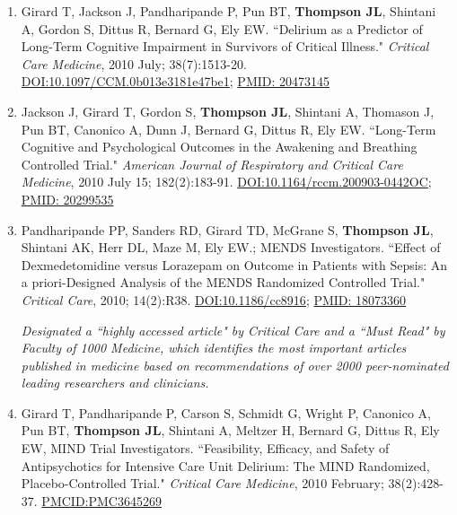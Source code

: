 \documentclass[5pt]{article}
\begin{document}
\begin{enumerate}
\item Girard T, Jackson J, Pandharipande P, Pun BT, \textbf{Thompson JL}, Shintani A, Gordon S, Dittus R, Bernard G, Ely EW. ``Delirium as a Predictor of Long-Term Cognitive Impairment in Survivors of Critical Illness." \emph{Critical Care Medicine}, 2010 July; 38(7):1513-20. \href{https://doi.org/10.1097/CCM.0b013e3181e47be1}{DOI:10.1097/CCM.0b013e3181e47be1}; \href{https://www.ncbi.nlm.nih.gov/pubmed/20473145}{PMID: 20473145}
\item Jackson J, Girard T, Gordon S, \textbf{Thompson JL}, Shintani A, Thomason J, Pun BT, Canonico A, Dunn J, Bernard G, Dittus R, Ely EW. ``Long-Term Cognitive and Psychological Outcomes in the Awakening and Breathing Controlled Trial." \emph{American Journal of Respiratory and Critical Care Medicine}, 2010 July 15; 182(2):183-91. \href{https://doi.org/10.1164/rccm.200903-0442OC}{DOI:10.1164/rccm.200903-0442OC}; \href{https://www.ncbi.nlm.nih.gov/pubmed/20299535}{PMID: 20299535}
\item Pandharipande PP, Sanders RD, Girard TD, McGrane S, \textbf{Thompson JL}, Shintani AK, Herr DL, Maze M, Ely EW.; MENDS Investigators. ``Effect of Dexmedetomidine versus Lorazepam on Outcome in Patients with Sepsis: An a priori-Designed Analysis of the MENDS Randomized Controlled Trial." \emph{Critical Care}, 2010; 14(2):R38. \href{https://doi.org/10.1186/cc8916}{DOI:10.1186/cc8916}; \href{https://www.ncbi.nlm.nih.gov/pubmed/18073360}{PMID: 18073360}

    \emph{Designated a ``highly accessed article" by Critical Care and a ``Must Read" by Faculty of 1000 Medicine, which identifies the most important articles published in medicine based on recommendations of over 2000 peer-nominated leading researchers and clinicians.}
\item Girard T, Pandharipande P, Carson S, Schmidt G, Wright P, Canonico A, Pun BT, \textbf{Thompson JL}, Shintani A, Meltzer H, Bernard G, Dittus R, Ely EW, MIND Trial Investigators. ``Feasibility, Efficacy, and Safety of Antipsychotics for Intensive Care Unit Delirium: The MIND Randomized, Placebo-Controlled Trial." \emph{Critical Care Medicine}, 2010 February; 38(2):428-37. \href{https://www.ncbi.nlm.nih.gov/pmc/articles/PMC3645269/}{PMCID:PMC3645269}


\end{enumerate}
\end{document}
